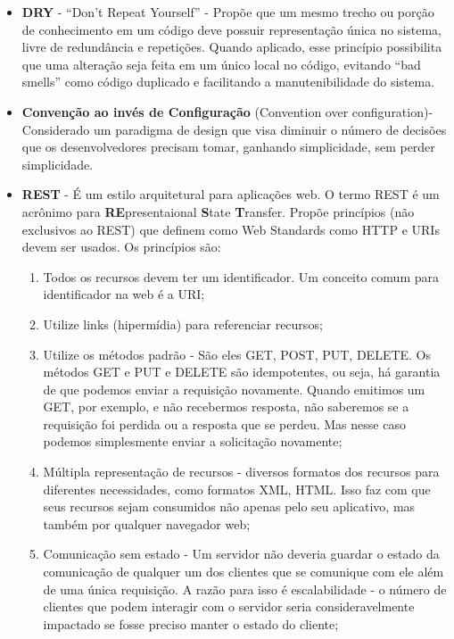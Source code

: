 \begin{itemize}

\item \textbf{DRY} - “Don’t Repeat Yourself” - Propõe que um mesmo trecho ou porção de
conhecimento em um código deve possuir representação única no sistema, livre de
redundância e repetições. Quando aplicado, esse princípio possibilita que uma alteração
seja feita em um único local no código, evitando “bad smells” como código duplicado e
facilitando a manutenibilidade do sistema.

\item \textbf{Convenção ao invés de Configuração} (Convention over configuration)- Considerado um paradigma de design que visa diminuir o número de decisões que os desenvolvedores precisam tomar, ganhando simplicidade, sem perder simplicidade.

\item \textbf{REST} - É um estilo arquitetural para aplicações web. O termo REST é um acrônimo para \textbf{RE}presentaional \textbf{S}tate \textbf{T}ransfer. Propõe princípios (não exclusivos ao REST) que definem como Web Standards como HTTP e URIs devem ser usados. Os princípios são:
  \begin{enumerate}  
  \item Todos os recursos devem ter um identificador. Um conceito comum para identificador na web é a URI;

  \item Utilize links (hipermídia) para referenciar recursos;

  \item Utilize os métodos padrão - São eles GET, POST, PUT, DELETE. Os métodos GET e PUT e DELETE são idempotentes, ou seja, há garantia de que podemos enviar a requisição novamente. Quando emitimos um GET, por exemplo, e não recebermos resposta, não saberemos se a requisição foi perdida ou a resposta que se perdeu. Mas nesse caso podemos simplesmente enviar a solicitação novamente;

  \item Múltipla representação de recursos - diversos formatos dos recursos para diferentes necessidades, como formatos XML, HTML. Isso faz com que seus recursos sejam consumidos não apenas pelo seu aplicativo, mas também por qualquer navegador web;

  \item Comunicação sem estado - Um servidor não deveria guardar o estado da comunicação de qualquer um dos clientes que se comunique com ele além de uma única requisição. A razão para isso é escalabilidade - o número de clientes que podem interagir com o servidor seria consideravelmente impactado se fosse preciso manter o estado do cliente;

  \end{enumerate}
\end{itemize}

